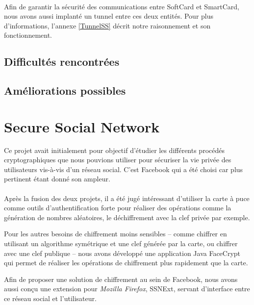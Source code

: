 \documentclass[a4paper,11pt,french]{article}
\begin{document}
\paragraph{}
Afin de garantir la sécurité des communications entre SoftCard et SmartCard,
nous avons aussi implanté un tunnel entre ces deux entités. Pour plus 
d'informations, l'annexe \ref{TunnelSS} décrit notre raisonnement et son
fonctionnement.

\subsection{Difficultés rencontrées}



\subsection{Améliorations possibles}

\clearpage

\section{Secure Social Network}
Ce projet avait initialement pour objectif d'étudier les différents 
procédés cryptographiques que nous pouvions utiliser pour sécuriser la vie
privée des utilisateurs vis-à-vis d'un réseau social. C'est Facebook qui a 
été choisi car plus pertinent étant donné son ampleur. 

\paragraph{}
Après la fusion des deux projets, il a été jugé intéressant d'utiliser 
la carte à puce comme outils d'authentification forte pour réaliser des 
opérations comme la génération de nombres aléatoires, le déchiffrement 
avec la clef privée par exemple.

Pour les autres besoins de chiffrement moins sensibles -- comme chiffrer
en utilisant un algorithme symétrique et une clef générée par la carte, ou
chiffrer avec une clef publique -- nous avons développé une application
Java \og{}FaceCrypt \fg{} qui permet de réaliser les opérations de chiffrement
plus rapidement que la carte.

Afin de proposer une solution de chiffrement au sein de Facebook, nous avons 
aussi conçu une extension pour \emph{Mozilla Firefox}, SSNExt, servant 
d'interface entre ce réseau social et l'utilisateur.
\end{document}
